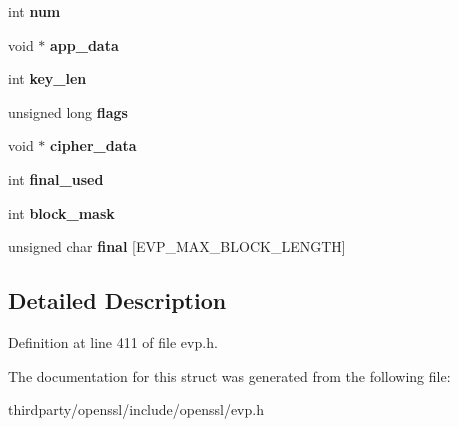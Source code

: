 \begin{DoxyCompactItemize}
int {\bfseries num}
\item 
\mbox{\label{structevp__cipher__ctx__st_a00e9113f48a52bc9b1b95cc01a2560fa}} 
void $\ast$ {\bfseries app\+\_\+data}
\item 
\mbox{\label{structevp__cipher__ctx__st_a61064bef0c7565f3509f8d48f253637d}} 
int {\bfseries key\+\_\+len}
\item 
\mbox{\label{structevp__cipher__ctx__st_acc3a9b3a3e5a7ca498e3f5817ffc533f}} 
unsigned long {\bfseries flags}
\item 
\mbox{\label{structevp__cipher__ctx__st_a9f5ecc2a2fb070546367e44efc1d2ce8}} 
void $\ast$ {\bfseries cipher\+\_\+data}
\item 
\mbox{\label{structevp__cipher__ctx__st_a3cc687900b93b8cc130b52b0d5d9a836}} 
int {\bfseries final\+\_\+used}
\item 
\mbox{\label{structevp__cipher__ctx__st_aaa51b6dbde049f6b51227aab31a9c21d}} 
int {\bfseries block\+\_\+mask}
\item 
\mbox{\label{structevp__cipher__ctx__st_afe49879d0b4707382a3477ebb4eda55b}} 
unsigned char {\bfseries final} \mbox{[}E\+V\+P\+\_\+\+M\+A\+X\+\_\+\+B\+L\+O\+C\+K\+\_\+\+L\+E\+N\+G\+TH\mbox{]}
\end{DoxyCompactItemize}


\subsection{Detailed Description}


Definition at line 411 of file evp.\+h.



The documentation for this struct was generated from the following file\+:\begin{DoxyCompactItemize}
\item 
thirdparty/openssl/include/openssl/evp.\+h\end{DoxyCompactItemize}
